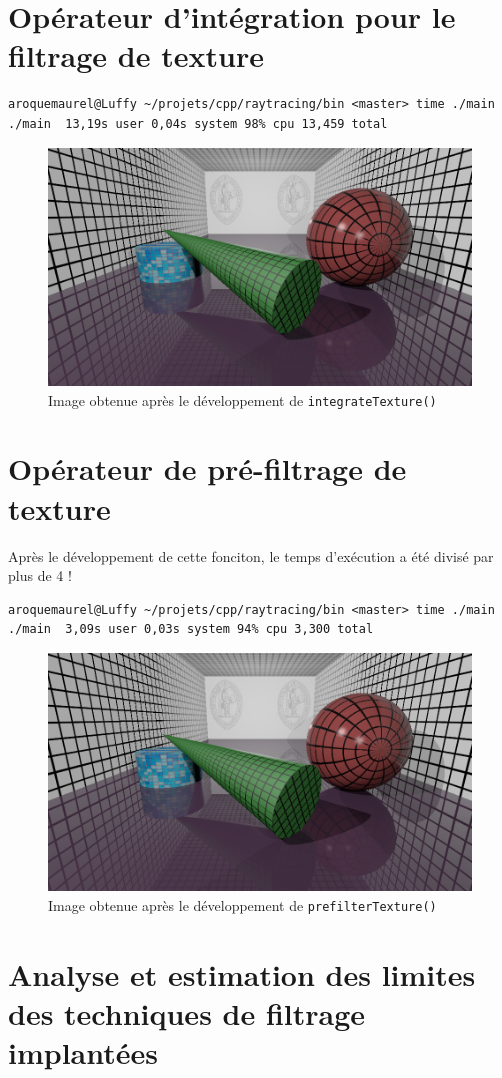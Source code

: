 \documentclass[a4paper, 11pt]{article}
\begin{document}
	\section{Opérateur d'intégration pour le filtrage de texture}
\begin{lstlisting}[language=Sh]
aroquemaurel@Luffy ~/projets/cpp/raytracing/bin <master> time ./main
./main  13,19s user 0,04s system 98% cpu 13,459 total
\end{lstlisting}
	\begin{figure}[H]
		\centering
		\includegraphics[width=12cm]{3-monimage.png}
		\caption{Image obtenue après le développement de \texttt{integrateTexture()}}
		\label{fig:fig1}
	\end{figure}
	\section{Opérateur de pré-filtrage de texture}

	Après le développement de cette fonciton, le temps d'exécution a été divisé par plus de 4 ! 
\begin{lstlisting}[language=Sh]
aroquemaurel@Luffy ~/projets/cpp/raytracing/bin <master> time ./main
./main  3,09s user 0,03s system 94% cpu 3,300 total
\end{lstlisting}
	\begin{figure}[H]
		\centering
		\includegraphics[width=12cm]{3-monimage.png}
		\caption{Image obtenue après le développement de \texttt{prefilterTexture()}}
		\label{fig:fig1}
	\end{figure}

	\section{Analyse et estimation des limites des techniques de filtrage implantées}
\end{document}
